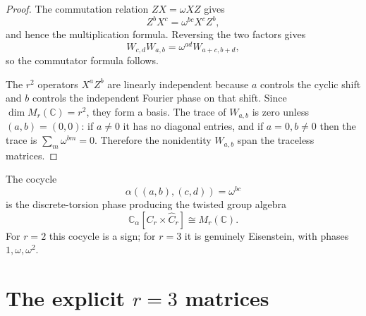 \documentclass[11pt]{article}
\theoremstyle{remark}
\newcommand{\CC}{\mathbb C}
\begin{document}
\begin{proof}
The commutation relation $ZX=\omega XZ$ gives
\[
        Z^bX^c=\omega^{bc}X^cZ^b,
\]
and hence the multiplication formula.  Reversing the two factors gives
\[
        W_{c,d}W_{a,b}=\omega^{ad}W_{a+c,b+d},
\]
so the commutator formula follows.

The $r^2$ operators $X^aZ^b$ are linearly independent because $a$ controls the cyclic shift and $b$ controls the independent Fourier phase on that shift.  Since $\dim M_r(\CC)=r^2$, they form a basis.  The trace of $W_{a,b}$ is zero unless $(a,b)=(0,0)$: if $a\ne0$ it has no diagonal entries, and if $a=0,b\ne0$ then the trace is $\sum_m\omega^{bm}=0$.  Therefore the nonidentity $W_{a,b}$ span the traceless matrices.\end{proof}

The cocycle
\[
        \alpha((a,b),(c,d))=\omega^{bc}
\]
is the discrete-torsion phase producing the twisted group algebra
\[
        \CC_\alpha[C_r\times\widehat C_r]\cong M_r(\CC).
\]
For $r=2$ this cocycle is a sign; for $r=3$ it is genuinely Eisenstein, with phases $1,\omega,\omega^2$.

\section{The explicit $r=3$ matrices}
\end{document}
